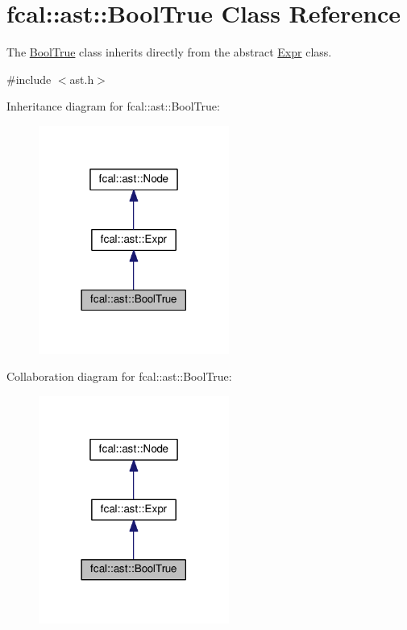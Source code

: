 \hypertarget{classfcal_1_1ast_1_1BoolTrue}{}\section{fcal\+:\+:ast\+:\+:Bool\+True Class Reference}
\label{classfcal_1_1ast_1_1BoolTrue}


The \hyperlink{classfcal_1_1ast_1_1BoolTrue}{Bool\+True} class inherits directly from the abstract \hyperlink{classfcal_1_1ast_1_1Expr}{Expr} class.  




{\ttfamily \#include $<$ast.\+h$>$}



Inheritance diagram for fcal\+:\+:ast\+:\+:Bool\+True\+:\nopagebreak
\begin{figure}[H]
\begin{center}
\leavevmode
\includegraphics[width=177pt]{classfcal_1_1ast_1_1BoolTrue__inherit__graph}
\end{center}
\end{figure}


Collaboration diagram for fcal\+:\+:ast\+:\+:Bool\+True\+:\nopagebreak
\begin{figure}[H]
\begin{center}
\leavevmode
\includegraphics[width=177pt]{classfcal_1_1ast_1_1BoolTrue__coll__graph}
\end{center}
\end{figure}
